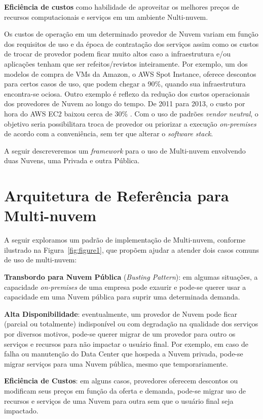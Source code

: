 \documentclass[12pt]{article}
\begin{document}
	\textbf{Eficiência de custos} como habilidade de aproveitar os melhores preços de recursos computacionais e serviços em um ambiente Nulti-nuvem.
	
	Os custos de operação em um determinado provedor de Nuvem variam em função dos requisitos de uso e da época de contratação dos serviços assim como os custos de trocar de provedor podem ficar muito altos caso a infraestrutura e/ou aplicações tenham que ser refeitos/revistos inteiramente. Por exemplo, um dos modelos de compra de VMs da Amazon, o AWS Spot Instance, oferece descontos para certos casos de uso, que podem chegar a 90\%, quando sua infraestrutura encontra-se ociosa. Outro exemplo é reflexo da redução dos custos operacionais dos provedores de Nuvem ao longo do tempo. De 2011 para 2013, o custo por hora do AWS EC2 baixou cerca de 30\% \cite{Golden:2013}. Com o uso de padrões \textit{vendor neutral}, o objetivo seria possibilitara troca de provedor ou priorizar a execução \textit{on-premises} de acordo com a conveniência, sem ter que alterar o \textit{software stack}.
	
	A seguir descreveremos um \textit{framework} para o uso de Multi-nuvem envolvendo duas Nuvens, uma Privada e outra Pública. 
	
	\section{Arquitetura de Referência para Multi-nuvem}
	
	A seguir exploramos um padrão de implementação de Multi-nuvem, conforme ilustrado na Figura~\ref{fig:figure1}, que propõem ajudar a atender dois casos comuns de uso de multi-nuvem:
	
	\textbf{Transbordo para Nuvem Pública} (\textit{Busting Pattern}): em algumas situações, a capacidade \textit{on-premises} de uma empresa pode exaurir e pode-se querer usar a capacidade em uma Nuvem pública para suprir uma determinada demanda.
	
	\textbf{Alta Disponibilidade}: eventualmente, um provedor de Nuvem pode ficar (parcial ou totalmente) indisponível ou com degradação na qualidade dos serviços por diversos motivos, pode-se querer migrar de um provedor para outro os serviços e recursos para não impactar o usuário final. Por exemplo, em caso de falha ou manutenção do Data Center que hospeda a Nuvem privada, pode-se migrar serviços para uma Nuvem pública, mesmo que temporariamente.
	   
	\textbf{Eficiência de Custos}: em alguns casos, provedores oferecem descontos ou modificam seus preços em função da oferta e demanda, pode-se migrar uso de recursos e serviços de uma Nuvem para outra sem que o usuário final seja impactado.
	
\end{document}
